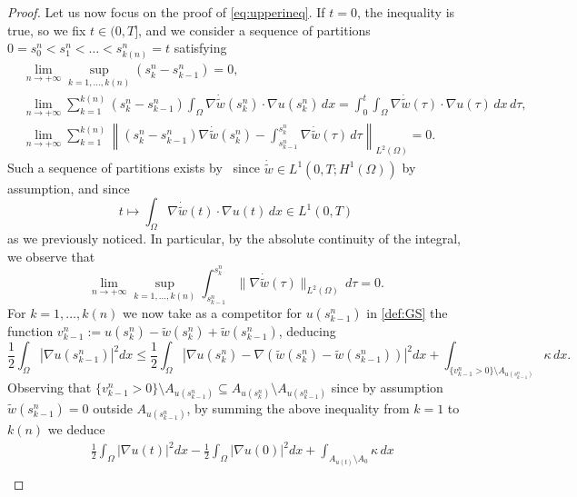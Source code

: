 \documentclass[a4paper,11pt,reqno]{amsart}
\numberwithin{equation}{section}
\theoremstyle{definition}
\theoremstyle{remark}
\begin{document}
\begin{proof}
    Let us now focus on the proof of \eqref{eq:upperineq}. If $t=0$, the inequality is true, so we fix $t\in (0,T]$, and we consider a sequence of partitions $0=s_0^n<s_1^n<\dots<s^n_{k(n)}=t$ satisfying
    \begin{align}
        &\lim\limits_{n\to +\infty}\sup_{k=1,\dots,k(n)}(s^n_k-s^n_{k-1})=0,\label{eq:1}\\
        &\lim\limits_{n\to +\infty} \sum_{k=1}^{k(n)} (s^n_k-s^n_{k-1})\int_\Omega \nabla \dot{\widetilde w}(s^n_k)\cdot \nabla u(s^n_k)\, dx= \int_0^t\int_\Omega \nabla \dot{\widetilde w}(\tau)\cdot \nabla u(\tau)\,dx\,d\tau,\label{eq:2}\\
        &\lim\limits_{n\to +\infty} \sum_{k=1}^{k(n)}\left\|(s^n_k-s^n_{k-1})\nabla \dot{\widetilde w}(s^n_k)-\int_{s^n_{k-1}}^{s^n_k} \nabla \dot{\widetilde w}(\tau)\,d\tau\right\|_{L^2(\Omega)}=0. \label{eq:3}       
    \end{align}
    Such a sequence of partitions exists by~\cite[Lemma~4.5]{FrancMielk} since $\dot{\widetilde w}\in L^1(0,T;H^1(\Omega))$ by assumption, and since
    \begin{equation}
        t\mapsto \int_\Omega \nabla\dot{\widetilde w}(t)\cdot \nabla u(t)\,dx\in L^1(0,T)
    \end{equation}
    as we previously noticed. In particular, by the absolute continuity of the integral, we observe that
    \begin{equation}\label{eq:4}
        \lim\limits_{n\to +\infty}\sup_{k=1,\dots,k(n)}\int_{s^n_{k-1}}^{s^n_k}\|\nabla \dot{\widetilde w}(\tau)\|_{L^2(\Omega)}\, d\tau=0.
    \end{equation}
 For $k=1,\dots,k(n)$ we now take as a competitor for $u(s^n_{k-1})$ in \ref{def:GS} the function $v_{k-1}^n:= u(s^n_k)-\widetilde w(s^n_{k})+\widetilde w(s^n_{k-1})$, deducing 
 \begin{equation}
        \frac 12 \int_\Omega |\nabla u(s^n_{k-1})|^2 dx\le \frac 12 \int_\Omega |\nabla u(s^n_k)-\nabla (\widetilde w(s^n_{k})-\widetilde w(s^n_{k-1}))|^2 dx+\int_{\{v^n_{k-1}>0\}\setminus A_{u(s^n_{k-1})}}\kappa\, dx.
    \end{equation}
    Observing that $\{v^n_{k-1}>0\}\setminus A_{u(s^n_{k-1})}\subseteq A_{u(s^n_{k})}\setminus A_{u(s^n_{k-1})}$ since by assumption $\widetilde w(s^n_{k-1})=0$ outside $A_{u(s^n_{k-1})}$, by summing the above inequality from $k=1$ to $k(n)$ we deduce
    {\allowdisplaybreaks\begin{align}
        &\,\frac 12 \int_\Omega |\nabla u(t)|^2 dx-\frac 12 \int_\Omega |\nabla u(0)|^2 dx+\int_{A_{u(t)}\setminus A_0}\kappa\, dx \\

\end{align}}
\end{proof}
\end{document}
